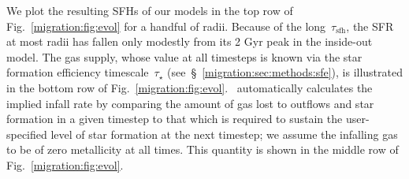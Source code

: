 We plot the resulting SFHs of our models in the top row of Fig.~\ref{migration:fig:evol} 
for a handful of radii. 
Because of the long~$\tau_\text{sfh}$, the SFR at most radii has fallen only 
modestly from its 2 Gyr peak in the inside-out model. 
The gas supply, whose value at all timesteps is known via the star formation 
efficiency timescale~$\tau_\star$ (see~\S~\ref{migration:sec:methods:sfe}), is 
illustrated in the bottom row of Fig.~\ref{migration:fig:evol}. 
\vice~automatically calculates the implied infall rate by comparing the amount 
of gas lost to outflows and star formation in a given timestep to that which is 
required to sustain the user-specified level of star formation at the next 
timestep; we assume the infalling gas to be of zero metallicity at all times. 
This quantity is shown in the middle row of Fig.~\ref{migration:fig:evol}. 

